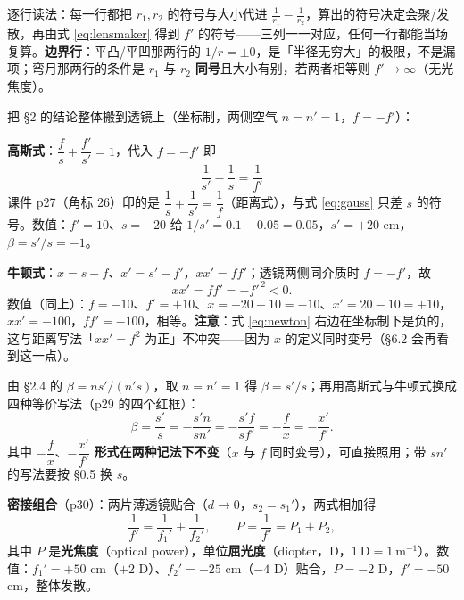 \documentclass[11pt]{ctexart}
\begin{document}
逐行读法：每一行都把 $r_1,r_2$ 的符号与大小代进 $\frac{1}{r_1}-\frac{1}{r_2}$，算出的符号决定会聚/发散，再由式 \eqref{eq:lensmaker} 得到 $f'$ 的符号——三列一一对应，任何一行都能当场复算。\textbf{边界行}：平凸/平凹那两行的 $1/r=\pm0$，是「半径无穷大」的极限，不是漏项；弯月那两行的条件是 $r_1$ 与 $r_2$ \textbf{同号}且大小有别，若两者相等则 $f'\to\infty$（无光焦度）。



把 §2 的结论整体搬到透镜上（坐标制，两侧空气 $n=n'=1$，$f=-f'$）：

\textbf{高斯式}：$\dfrac{f}{s}+\dfrac{f'}{s'}=1$，代入 $f=-f'$ 即
\begin{equation}
\boxed{\ \frac{1}{s'}-\frac{1}{s}=\frac{1}{f'}\ }\label{eq:gauss}
\end{equation}
课件 p27（角标 26）印的是 $\dfrac{1}{s}+\dfrac{1}{s'}=\dfrac{1}{f}$（距离式），与式 \eqref{eq:gauss} 只差 $s$ 的符号。数值：$f'=10$、$s=-20$ 给 $1/s'=0.1-0.05=0.05$，$s'=+20$ cm，$\beta=s'/s=-1$。

\textbf{牛顿式}：$x=s-f$、$x'=s'-f'$，$xx'=ff'$；透镜两侧同介质时 $f=-f'$，故
\begin{equation}
xx'=ff'=-f'^{\,2}<0 .\label{eq:newton}
\end{equation}
数值（同上）：$f=-10$、$f'=+10$、$x=-20+10=-10$、$x'=20-10=+10$，$xx'=-100$，$ff'=-100$，相等。\textbf{注意}：式 \eqref{eq:newton} 右边在坐标制下是负的，这与距离写法「$xx'=f^2$ 为正」不冲突——因为 $x$ 的定义同时变号（§6.2 会再看到这一点）。


由 §2.4 的 $\beta=ns'/(n's)$，取 $n=n'=1$ 得 $\beta=s'/s$；再用高斯式与牛顿式换成四种等价写法（p29 的四个红框）：
\[
\beta=\frac{s'}{s}=-\frac{s'n}{sn'}=-\frac{s'f}{sf'}=-\frac{f}{x}=-\frac{x'}{f'} .
\]
其中 $-\dfrac{f}{x}$、$-\dfrac{x'}{f'}$ \textbf{形式在两种记法下不变}（$x$ 与 $f$ 同时变号），可直接照用；带 $sn'$ 的写法要按 §0.5 换 $s$。

\textbf{密接组合}（p30）：两片薄透镜贴合（$d\to0$，$s_2=s_1'$），两式相加得
\[
\frac{1}{f'}=\frac{1}{f_1'}+\frac{1}{f_2'},\qquad
P=\frac{1}{f'}=P_1+P_2 ,
\]
其中 $P$ 是\textbf{光焦度}（optical power），单位\textbf{屈光度}（diopter，D，$1\ \mathrm{D}=1\ \mathrm{m^{-1}}$）。数值：$f_1'=+50$ cm（$+2$ D）、$f_2'=-25$ cm（$-4$ D）贴合，$P=-2$ D，$f'=-50$ cm，整体发散。
\end{document}
